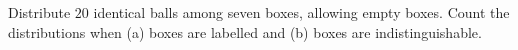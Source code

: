Distribute $20$ identical balls among seven boxes, allowing empty boxes. Count the distributions when (a) boxes are labelled and (b) boxes are indistinguishable.
